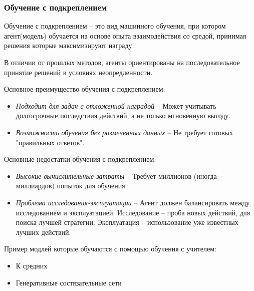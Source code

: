 \documentclass[../part_1.tex]{subfiles}
\begin{document}
\subsubsection{Обучение с подкреплением} %
    \label{sec:reinforcement_learning}
    \par Обучение с подкреплением --  это вид машинного обучения, при котором агент(модель) обучается на основе опыта взаимодействия со средой, принимая решения которые максимизируют награду.
    \par В отличии от прошлых методов, агенты ориентированы на последовательное принятие решений в условиях неопредленности.
    \par Основное преимущество обучения с подкреплением:
    \begin{itemize}
        \item \textit{Подходит для задач с отложенной наградой} -- Может учитывать долгосрочные последствия действий, а не только мгновенную выгоду.
        \item \textit{Возможность обучения без размеченных данных} -- Не требует готовых "правильных ответов".
    \end{itemize}
    \par Основные недостатки обучения с подкреплением:
    \begin{itemize}
        \item \textit{Высокие вычислительные затраты} -- Требует миллионов (иногда миллиардов) попыток для обучения.
        \item \textit{Проблема исследования-эксплуатации} -- Агент должен балансировать между исследованием и эксплуатацией. Исследование -- проба новых действий, для поиска лучшей стратегии. Эксплуатация -- использование уже известных лучших действий.
    \end{itemize}
    \par Пример модлей которые обучаются с помощью обучения с учителем:
    \begin{itemize}
        \item К средних
        \item Генеративные состязательные сети
    \end{itemize}
\end{document}
